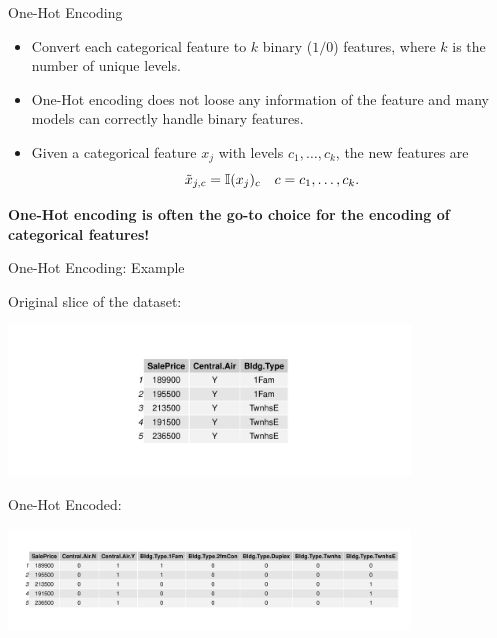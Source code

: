\begin{vbframe}{One-Hot Encoding}

\begin{itemize}
\item Convert each categorical feature to $k$ binary ($1/0$) features, where $k$ is the number of unique levels.

\item One-Hot encoding does not loose any information of the feature and many models can correctly handle binary features.

\item Given a categorical feature $x_j$ with levels $c_1,\dots, c_k$, the new features are
$$\tilde x_{j,c} = \mathbb{I}(x_j)_{c} \quad c = c_1,\dots,c_k.$$
\end{itemize}

\textbf{One-Hot encoding is often the go-to choice for the encoding of categorical features!}

\end{vbframe}

\begin{vbframe}{One-Hot Encoding: Example}

Original slice of the dataset:

\vfill

\begin{center}
\includegraphics[width = 0.8\textwidth]{figure/categorical_original_table.pdf}
\end{center}

\vfill

One-Hot Encoded:

\vfill

\begin{center}
\includegraphics[width = 0.8\textwidth]{figure/categorical_onehot_table.pdf}
\end{center}

\vfill

\end{vbframe}

